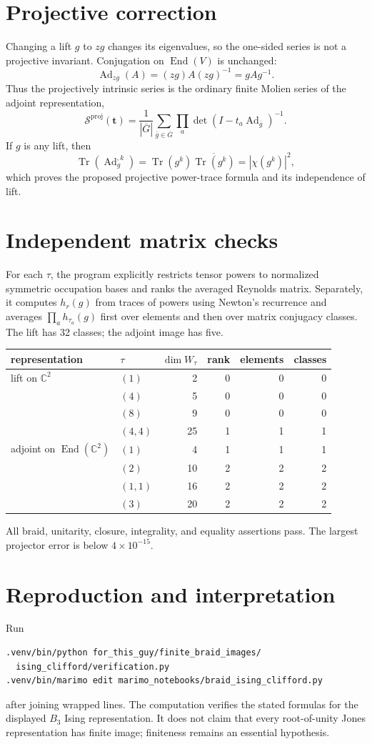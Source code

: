 \documentclass[11pt]{article}
\newcommand{\Sgm}{\mathcal S}
\begin{document}
\section{Projective correction}
Changing a lift $g$ to $zg$ changes its eigenvalues, so the one-sided series
is not a projective invariant.  Conjugation on $\operatorname{End}(V)$ is
unchanged:
\[
 \operatorname{Ad}_{zg}(A)=(zg)A(zg)^{-1}=gAg^{-1}.
\]
Thus the projectively intrinsic series is the ordinary finite Molien series
of the adjoint representation,
\[
 \Sgm^{\mathrm{proj}}(\mathbf t)=\frac1{|\overline G|}
 \sum_{\bar g\in\overline G}\prod_a
 \det(I-t_a\operatorname{Ad}_{\bar g})^{-1}.
\]
If $g$ is any lift, then
\[
 \operatorname{Tr}(\operatorname{Ad}_{g}^{,k})
 =\operatorname{Tr}(g^k)\overline{\operatorname{Tr}(g^k)}
 =|\chi(g^k)|^2,
\]
which proves the proposed projective power-trace formula and its independence
of lift.

\section{Independent matrix checks}
For each $\tau$, the program explicitly restricts tensor powers to normalized
symmetric occupation bases and ranks the averaged Reynolds matrix.  Separately,
it computes $h_r(g)$ from traces of powers using Newton's recurrence and
averages $\prod_a h_{\tau_a}(g)$ first over elements and then over matrix
conjugacy classes.  The lift has 32 classes; the adjoint image has five.

\begin{center}
\begin{tabular}{@{}llrrrr@{}}\toprule
representation&$\tau$&$\dim W_\tau$&rank&elements&classes\\\midrule
lift on $\mathbb C^2$&$(1)$&2&0&0&0\\
&$(4)$&5&0&0&0\\
&$(8)$&9&0&0&0\\
&$(4,4)$&25&1&1&1\\\addlinespace
adjoint on $\operatorname{End}(\mathbb C^2)$&$(1)$&4&1&1&1\\
&$(2)$&10&2&2&2\\
&$(1,1)$&16&2&2&2\\
&$(3)$&20&2&2&2\\\bottomrule
\end{tabular}
\end{center}
All braid, unitarity, closure, integrality, and equality assertions pass.  The
largest projector error is below $4\times10^{-15}$.

\section{Reproduction and interpretation}
Run
\begin{verbatim}
.venv/bin/python for_this_guy/finite_braid_images/
  ising_clifford/verification.py
.venv/bin/marimo edit marimo_notebooks/braid_ising_clifford.py
\end{verbatim}
after joining wrapped lines.  The computation verifies the stated formulas
for the displayed $B_3$ Ising representation.  It does not claim that every
root-of-unity Jones representation has finite image; finiteness remains an
essential hypothesis.
\end{document}
